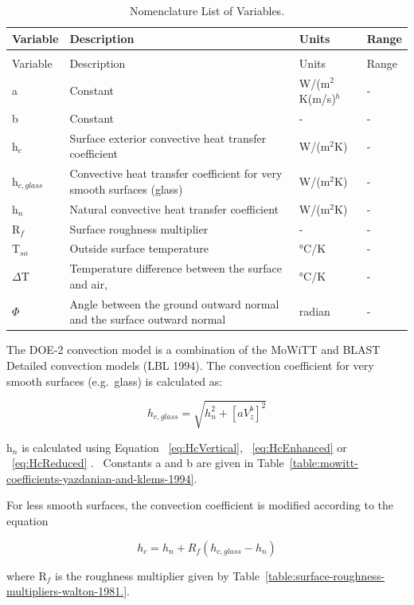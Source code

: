 \begin{longtable}[c]{p{0.5in}p{3.0in}p{1.5in}p{1.0in}}

\caption{Nomenclature List of Variables. \label{table:nomenclature-list-of-variables.-003}} \tabularnewline
\toprule 
Variable & Description & Units & Range \tabularnewline
\midrule
\endfirsthead

\caption[]{Nomenclature List of Variables.} \tabularnewline
\toprule 
Variable & Description & Units & Range \tabularnewline
\midrule
\endhead

a & Constant & W/(m\(^{2}\)K(m/s)\(^{b}\) & - \tabularnewline
b & Constant & - & - \tabularnewline
h\(_{c}\) & Surface exterior convective heat transfer coefficient & W/(m\(^{2}\)K) & - \tabularnewline
h\(_{c,glass}\) & Convective heat transfer coefficient for very smooth surfaces (glass) & W/(m\(^{2}\)K) & - \tabularnewline
h\(_{n}\) & Natural convective heat transfer coefficient & W/(m\(^{2}\)K) & - \tabularnewline
R\(_{f}\) & Surface roughness multiplier & - & - \tabularnewline
T\(_{so}\) & Outside surface temperature & °C/K & - \tabularnewline
$\Delta$T & Temperature difference between the surface and air, & °C/K & - \tabularnewline
$\Phi$ & Angle between the ground outward normal and the surface outward normal & radian & - \tabularnewline
\bottomrule
\end{longtable}


The DOE-2 convection model is a combination of the MoWiTT and BLAST Detailed convection models (LBL 1994). The convection coefficient for very smooth surfaces (e.g.~glass) is calculated as:

\begin{equation}
{h_{c,glass}} = \sqrt {h_n^2 + {{\left[ {aV_z^b} \right]}^2}}
\end{equation}

h\(_{n}\) is calculated using Equation ~\ref{eq:HcVertical}, ~\ref{eq:HcEnhanced} or ~\ref{eq:HcReduced} .~ Constants a and b are given in Table~\ref{table:mowitt-coefficients-yazdanian-and-klems-1994}.

For less smooth surfaces, the convection coefficient is modified according to the equation

\begin{equation}
{h_c} = {h_n} + {R_f}({h_{c,glass}} - {h_n})
\end{equation}

where R\(_{f}\) is the roughness multiplier given by Table~\ref{table:surface-roughness-multipliers-walton-1981.}.


